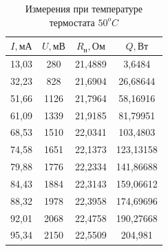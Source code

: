     \begin{table}[!ht]
        \begin{minipage}{.42\linewidth}
            \centering
            \begin{tabular}{|c|c|c|c|}
                \hline

                $I, \text{мА}$ & $U, \text{мВ}$ &  $R_\text{н}, \text{Ом}$ & $Q, \text{Вт}$\\ \hline
                13,03	& 280	& 21,4889	& 3,6484 \\ \hline
                32,23	& 828	& 21,6904	& 26,68644 \\ \hline
                51,66	& 1126	& 21,7964	& 58,16916 \\ \hline
                61,09	& 1339	& 21,9185	& 81,79951 \\ \hline
                68,53	& 1510	& 22,0341	& 103,4803 \\ \hline
                74,58	& 1651	& 22,1373	& 123,13158 \\ \hline
                79,88	& 1776	& 22,2334	& 141,86688 \\ \hline
                84,43	& 1884	& 22,3143	& 159,06612 \\ \hline
                88,32	& 1978	& 22,3958	& 174,69696 \\ \hline
                92,01	& 2068	& 22,4758	& 190,27668 \\ \hline
                95,34	& 2150	& 22,5509	& 204,981 \\ \hline

            \end{tabular}
            \caption{Измерения при температуре термостата $50^oC$}
            \label{table_61}
        \end{minipage}
    \end{table}
